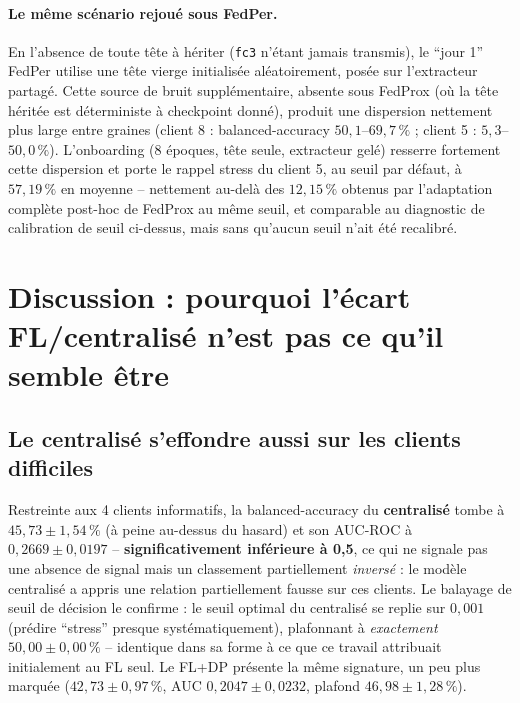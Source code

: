 \documentclass{acmart}
\begin{document}
\paragraph{Le même scénario rejoué sous FedPer.} En l'absence de toute tête à hériter
(\texttt{fc3} n'étant jamais transmis), le ``jour 1'' FedPer utilise une tête vierge
initialisée aléatoirement, posée sur l'extracteur partagé. Cette source de bruit
supplémentaire, absente sous FedProx (où la tête héritée est déterministe à checkpoint
donné), produit une dispersion nettement plus large entre graines (client 8 :
balanced-accuracy $50{,}1$--$69{,}7\,\%$ ; client 5 : $5{,}3$--$50{,}0\,\%$). L'onboarding
(8 époques, tête seule, extracteur gelé) resserre fortement cette dispersion et porte le
rappel stress du client 5, au seuil par défaut, à $57{,}19\,\%$ en moyenne -- nettement
au-delà des $12{,}15\,\%$ obtenus par l'adaptation complète post-hoc de FedProx au même
seuil, et comparable au diagnostic de calibration de seuil ci-dessus, mais sans qu'aucun
seuil n'ait été recalibré.

\section{Discussion : pourquoi l'écart FL/centralisé n'est pas ce qu'il semble être}
\label{sec:discussion}

\subsection{Le centralisé s'effondre aussi sur les clients difficiles}
\label{subsec:collapse}

Restreinte aux 4 clients informatifs, la balanced-accuracy du \textbf{centralisé}
tombe à $45{,}73\pm1{,}54\,\%$ (à peine au-dessus du hasard) et son AUC-ROC à
$0{,}2669\pm0{,}0197$ -- \textbf{significativement inférieure à 0,5}, ce qui ne
signale pas une absence de signal mais un classement partiellement \emph{inversé} :
le modèle centralisé a appris une relation partiellement fausse sur ces clients. Le
balayage de seuil de décision le confirme : le seuil optimal du centralisé se replie
sur $0{,}001$ (prédire ``stress'' presque systématiquement), plafonnant à
\emph{exactement} $50{,}00\pm0{,}00\,\%$ -- identique dans sa forme à ce que ce travail
attribuait initialement au FL seul. Le FL+DP présente la même signature, un peu plus
marquée ($42{,}73\pm0{,}97\,\%$, AUC $0{,}2047\pm0{,}0232$, plafond
$46{,}98\pm1{,}28\,\%$).
\end{document}
